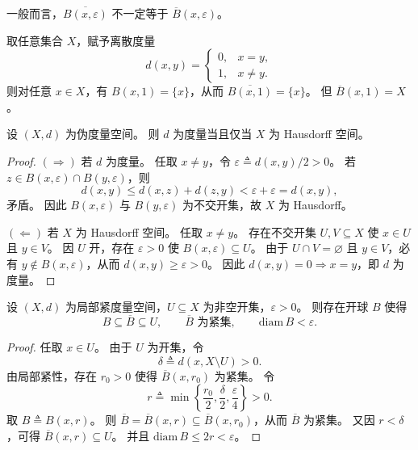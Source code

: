 \documentclass[lang=cn,a4paper,newtx,section]{elegantbook}
\begin{document}
\begin{remark}
  一般而言，$\overline{B(x,\varepsilon)}$ 不一定等于 $\overline{B}(x,\varepsilon)$。
\end{remark}

\begin{example}
  取任意集合 $X$，赋予离散度量
  \[
    d(x,y)=\begin{cases}
      0, & x=y,\\
      1, & x\ne y.
    \end{cases}
  \]
  则对任意 $x\in X$，有 $B(x,1)=\{x\}$，从而 $\overline{B(x,1)}=\{x\}$。
  但 $\overline{B}(x,1)=X$。
\end{example}

\begin{proposition}\label{prop:pseudometric-hausdorff-metric}
  设 $(X,d)$ 为伪度量空间。
  则 $d$ 为度量当且仅当 $X$ 为 Hausdorff 空间。
\end{proposition}

\begin{proof}
  $(\Rightarrow)$ 若 $d$ 为度量。
  任取 $x\ne y$，令 $\varepsilon\triangleq d(x,y)/2>0$。
  若 $z\in B(x,\varepsilon)\cap B(y,\varepsilon)$，则
  \[
    d(x,y)\le d(x,z)+d(z,y)<\varepsilon+\varepsilon=d(x,y),
  \]
  矛盾。
  因此 $B(x,\varepsilon)$ 与 $B(y,\varepsilon)$ 为不交开集，故 $X$ 为 Hausdorff。

  $(\Leftarrow)$ 若 $X$ 为 Hausdorff 空间。
  任取 $x\ne y$。
  存在不交开集 $U,V\subseteq X$ 使 $x\in U$ 且 $y\in V$。
  因 $U$ 开，存在 $\varepsilon>0$ 使 $B(x,\varepsilon)\subseteq U$。
  由于 $U\cap V=\varnothing$ 且 $y\in V$，必有 $y\notin B(x,\varepsilon)$，从而 $d(x,y)\ge \varepsilon>0$。
  因此 $d(x,y)=0\Rightarrow x=y$，即 $d$ 为度量。
\end{proof}

\begin{lemma}\label{lem:locally-compact-small-ball}
  设 $(X,d)$ 为局部紧度量空间，$U\subseteq X$ 为非空开集，$\varepsilon>0$。
  则存在开球 $B$ 使得
  \[
    B\subseteq \overline{B}\subseteq U,\qquad \overline{B}\text{ 为紧集},\qquad \mathrm{diam}\,B<\varepsilon.
  \]
\end{lemma}

\begin{proof}
  任取 $x\in U$。
  由于 $U$ 为开集，令
  \[
    \delta\triangleq d(x,X\setminus U)>0.
  \]
  由局部紧性，存在 $r_0>0$ 使得 $\overline{B}(x,r_0)$ 为紧集。
  令
  \[
    r\triangleq \min\left\{\frac{r_0}{2},\frac{\delta}{2},\frac{\varepsilon}{4}\right\}>0.
  \]
  取 $B\triangleq B(x,r)$。
  则 $\overline{B}=\overline{B}(x,r)\subseteq \overline{B}(x,r_0)$，从而 $\overline{B}$ 为紧集。
  又因 $r<\delta$，可得 $\overline{B}(x,r)\subseteq U$。
  并且 $\mathrm{diam}\,B\le 2r<\varepsilon$。
\end{proof}
\end{document}

